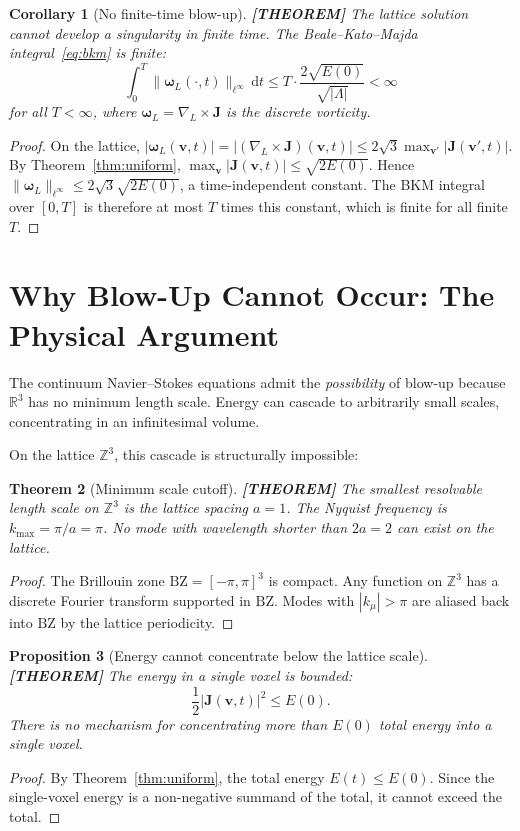 \documentclass[11pt]{article}
\theoremstyle{tight}
\newtheorem{theorem}{Theorem}[section]
\newtheorem{proposition}[theorem]{Proposition}
\newtheorem{corollary}[theorem]{Corollary}
\theoremstyle{plainroman}
\newcommand{\R}{\mathbb{R}}
\newcommand{\Z}{\mathbb{Z}}
\newcommand{\dd}{\,\mathrm{d}}
\newcommand{\BZ}{\mathrm{BZ}}
\begin{document}
\begin{corollary}[No finite-time blow-up]\label{cor:noblowup}
\textbf{[THEOREM]}
The lattice solution cannot develop a singularity in finite time.
The Beale--Kato--Majda integral~\eqref{eq:bkm} is finite:
\[
\int_0^T\|\bm\omega_L(\cdot,t)\|_{\ell^\infty}\dd t\le T\cdot\frac{2\sqrt{E(0)}}{\sqrt{|\Lambda|}}<\infty
\]
for all $T<\infty$, where $\bm\omega_L=\nabla_L\times\mathbf J$ is the discrete vorticity.
\end{corollary}
\begin{proof}
On the lattice, $|\bm\omega_L(\mathbf v,t)|=|(\nabla_L\times\mathbf J)(\mathbf v,t)|\le 2\sqrt{3}\max_{\mathbf v'}|\mathbf J(\mathbf v',t)|$.
By Theorem~\ref{thm:uniform}, $\max_{\mathbf v}|\mathbf J(\mathbf v,t)|\le\sqrt{2E(0)}$.
Hence $\|\bm\omega_L\|_{\ell^\infty}\le 2\sqrt{3}\sqrt{2E(0)}$, a time-independent constant.
The BKM integral over $[0,T]$ is therefore at most $T$ times this constant, which is finite for all finite $T$.
\end{proof}

\section{Why Blow-Up Cannot Occur: The Physical Argument}

The continuum Navier--Stokes equations admit the \emph{possibility} of blow-up because $\R^3$ has no minimum length scale.
Energy can cascade to arbitrarily small scales, concentrating in an infinitesimal volume.

On the lattice $\Z^3$, this cascade is structurally impossible:

\begin{theorem}[Minimum scale cutoff]\label{thm:cutoff}
\textbf{[THEOREM]}
The smallest resolvable length scale on $\Z^3$ is the lattice spacing $a=1$.
The Nyquist frequency is $k_{\max}=\pi/a=\pi$.
No mode with wavelength shorter than $2a=2$ can exist on the lattice.
\end{theorem}
\begin{proof}
The Brillouin zone $\BZ=[-\pi,\pi]^3$ is compact.
Any function on $\Z^3$ has a discrete Fourier transform supported in $\BZ$.
Modes with $|k_\mu|>\pi$ are aliased back into $\BZ$ by the lattice periodicity.
\end{proof}

\begin{proposition}[Energy cannot concentrate below the lattice scale]\label{prop:concentrate}
\textbf{[THEOREM]}
The energy in a single voxel is bounded:
\[
\frac{1}{2}|\mathbf J(\mathbf v,t)|^2\le E(0).
\]
There is no mechanism for concentrating more than $E(0)$ total energy into a single voxel.
\end{proposition}
\begin{proof}
By Theorem~\ref{thm:uniform}, the total energy $E(t)\le E(0)$.
Since the single-voxel energy is a non-negative summand of the total, it cannot exceed the total.
\end{proof}
\end{document}
